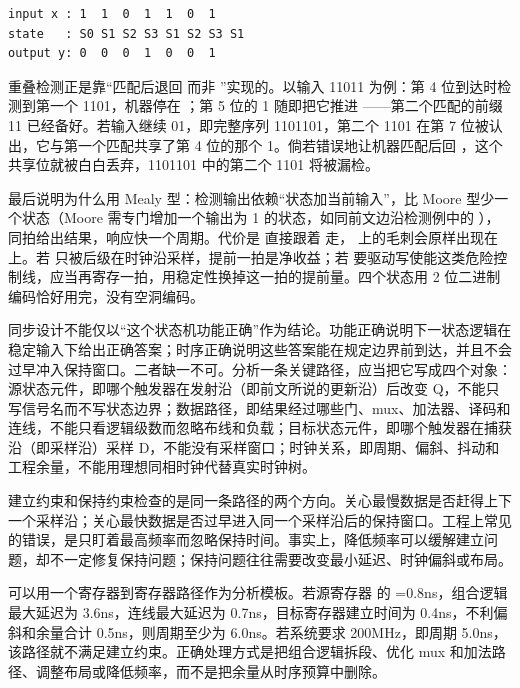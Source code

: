 \begin{lstlisting}
input x : 1  1  0  1  1  0  1
state   : S0 S1 S2 S3 S1 S2 S3 S1
output y: 0  0  0  1  0  0  1
\end{lstlisting}

重叠检测正是靠“匹配后退回  而非 ”实现的。以输入 11011 为例：第 4 位到达时检测到第一个 1101，机器停在 ；第 5 位的 1 随即把它推进 ——第二个匹配的前缀 11 已经备好。若输入继续 01，即完整序列 1101101，第二个 1101 在第 7 位被认出，它与第一个匹配共享了第 4 位的那个 1。倘若错误地让机器匹配后回 ，这个共享位就被白白丢弃，1101101 中的第二个 1101 将被漏检。

最后说明为什么用 Mealy 型：检测输出依赖“状态加当前输入”，比 Moore 型少一个状态（Moore 需专门增加一个输出为 1 的状态，如同前文边沿检测例中的 ），同拍给出结果，响应快一个周期。代价是  直接跟着  走， 上的毛刺会原样出现在  上。若  只被后级在时钟沿采样，提前一拍是净收益；若  要驱动写使能这类危险控制线，应当再寄存一拍，用稳定性换掉这一拍的提前量。四个状态用 2 位二进制编码恰好用完，没有空洞编码。


同步设计不能仅以“这个状态机功能正确”作为结论。功能正确说明下一状态逻辑在稳定输入下给出正确答案；时序正确说明这些答案能在规定边界前到达，并且不会过早冲入保持窗口。二者缺一不可。分析一条关键路径，应当把它写成四个对象：源状态元件，即哪个触发器在发射沿（即前文所说的更新沿）后改变 Q，不能只写信号名而不写状态边界；数据路径，即结果经过哪些门、mux、加法器、译码和连线，不能只看逻辑级数而忽略布线和负载；目标状态元件，即哪个触发器在捕获沿（即采样沿）采样 D，不能没有采样窗口；时钟关系，即周期、偏斜、抖动和工程余量，不能用理想同相时钟代替真实时钟树。

建立约束和保持约束检查的是同一条路径的两个方向。关心最慢数据是否赶得上下一个采样沿；关心最快数据是否过早进入同一个采样沿后的保持窗口。工程上常见的错误，是只盯着最高频率而忽略保持时间。事实上，降低频率可以缓解建立问题，却不一定修复保持问题；保持问题往往需要改变最小延迟、时钟偏斜或布局。

可以用一个寄存器到寄存器路径作为分析模板。若源寄存器  的 =0.8ns，组合逻辑最大延迟为 3.6ns，连线最大延迟为 0.7ns，目标寄存器建立时间为 0.4ns，不利偏斜和余量合计 0.5ns，则周期至少为 6.0ns。若系统要求 200MHz，即周期 5.0ns，该路径就不满足建立约束。正确处理方式是把组合逻辑拆段、优化 mux 和加法路径、调整布局或降低频率，而不是把余量从时序预算中删除。

